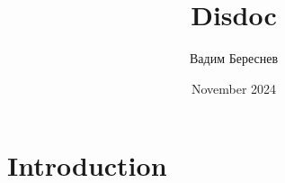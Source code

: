 \documentclass{article}
\title{Disdoc}
\author{Вадим Береснев}
\date{November 2024}
\begin{document}
\maketitle

\section{Introduction}
\end{document}
